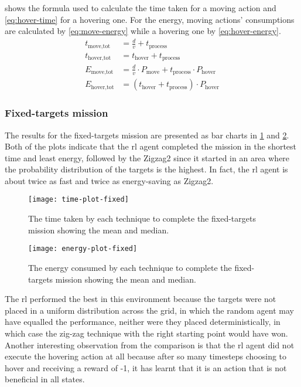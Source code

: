 \documentclass[../main.tex]{subfiles}
\begin{document}
 shows the formula used to
calculate the time taken for a moving action and
\cref{eq:hover-time} for a hovering one.
For the energy, moving actions' consumptions are calculated
by \cref{eq:move-energy} while a hovering one by
\cref{eq:hover-energy}.
\begin{align}
t_{\text{move,tot}} &= 
\frac{d}{v} + t_{\text{process}}
	\label{eq:move-time}
        \\
t_{\text{hover,tot}} &= 
t_{\text{hover}} + t_{\text{process}}
	\label{eq:hover-time}
        \\
E_{\text{move,tot}} &= 
\frac{d}{v} \cdot P_{\text{move}} 
+ t_{\text{process}} \cdot P_{\text{hover}}
	\label{eq:move-energy}
        \\
E_{\text{hover,tot}} &= 
\left( t_{\text{hover}} + t_{\text{process}} \right) \cdot P_{\text{hover}}
	\label{eq:hover-energy}
\end{align}

\subsubsection{Fixed-targets mission}

The results for the fixed-targets mission are presented as bar charts in 
\cref{fig:time-plot-fixed} and \cref{fig:energy-plot-fixed}.
Both of the plots indicate that the \gls{rl} agent completed
the mission in the shortest time and least energy, followed
by the Zigzag2 since it started in an area 
where the probability
distribution of the targets is the highest.
In fact, the \gls{rl} agent is about twice as fast and twice
as energy-saving as Zigzag2.

\begin{figure}[tbp]
	\centering
	\texttt{[image: time-plot-fixed]}
	\caption{The time taken by each technique
            to complete the fixed-targets mission showing the mean and
    median.}
        \label{fig:time-plot-fixed}
\end{figure}

\begin{figure}[tbp]
	\centering
	\texttt{[image: energy-plot-fixed]}
	\caption{The energy consumed by each technique
            to complete the fixed-targets mission showing the mean and
    median.}
        \label{fig:energy-plot-fixed}
\end{figure}

The \gls{rl} performed the best in this environment because
the targets were not placed in a uniform distribution
across the grid,
in which the random agent may have equalled the performance,
neither were they placed deterministically, 
in which case the zig-zag technique with the
right starting point would have won.
Another interesting observation from the comparison is that
the \gls{rl} agent did not execute the hovering action at all
because after so many timesteps choosing to hover and
receiving a reward of -1, it has learnt that it is an
action that is not beneficial in all states.
\end{document}
